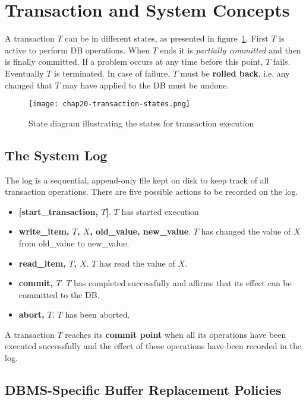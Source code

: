 \section{Transaction and System Concepts}
A transaction $T$ can be in different states, as presented in figure~\ref{fig:chap20-transaction-states}. First $T$ is active to perform DB operations. When $T$ ends it is \textit{partially committed} and then is finally committed. If a problem occurs at any time before this point, $T$ fails. Eventually $T$ is terminated. In case of failure, $T$ must be \textbf{rolled back}, i.e. any changed that $T$ may have applied to the DB must be undone.

\begin{figure}[h!]
    \centering
    \texttt{[image: chap20-transaction-states.png]}
    \caption{State diagram illustrating the states for transaction execution}
    \label{fig:chap20-transaction-states}
\end{figure}

\subsection{The System Log}
The log is a sequential, append-only file kept on disk to keep track of all transaction operations. There are five possible actions to be recorded on the log.

\begin{itemize}
    \item \textbf{[start\_transaction, $T$]}. $T$ has started execution
    \item \textbf{write\_item, $T$, $X$, old\_value, new\_value}. $T$ has changed the value of $X$ from old\_value to new\_value.
    \item \textbf{read\_item, $T$, $X$}. $T$ has read the value of $X$.
    \item \textbf{commit, $T$}. $T$ has completed successfully and affirms that its effect can be committed to the DB.
    \item \textbf{abort, $T$}. $T$ has been aborted.
\end{itemize}

A transaction $T$ reaches its \textbf{commit point} when all its operations have been executed successfully and the effect of these operations have been recorded in the log.

\subsection{DBMS-Specific Buffer Replacement Policies}

